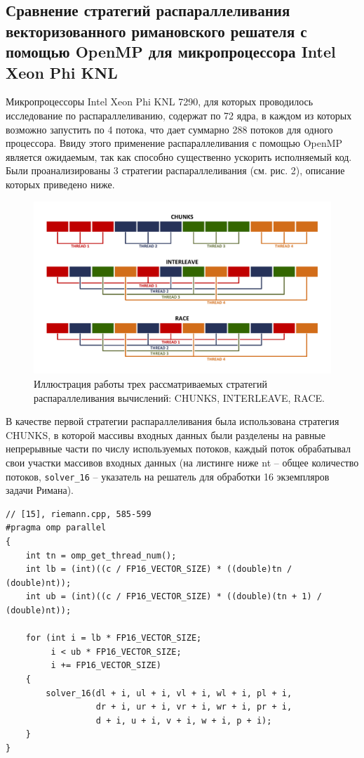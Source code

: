 \subsection{Сравнение стратегий распараллеливания векторизованного римановского решателя с помощью OpenMP для микропроцессора Intel Xeon Phi KNL}

Микропроцессоры Intel Xeon Phi KNL 7290, для которых проводилось исследование по распараллеливанию, содержат по 72 ядра, в каждом из которых возможно запустить  по 4 потока, что дает суммарно 288 потоков для одного процессора.
Ввиду этого применение распараллеливания с помощью OpenMP является ожидаемым, так как способно существенно ускорить исполняемый код. Были проанализированы 3 стратегии распараллеливания (см. рис. 2), описание которых приведено ниже.

\begin{figure}[ht]
\centering
\includegraphics[width=1.0\textwidth]{./pics/text_3_omp1/modes.pdf}
\caption{Иллюстрация работы трех рассматриваемых стратегий распараллеливания вычислений: CHUNKS, INTERLEAVE, RACE.}
\label{fig:text_3_omp1_modes}
\end{figure}

В качестве первой стратегии распараллеливания была использована стратегия CHUNKS, в которой массивы входных данных были разделены на равные непрерывные части по числу используемых потоков, каждый поток обрабатывал свои участки массивов входных данных (на листинге ниже nt -- общее количество потоков, \texttt{solver\_16} -- указатель на решатель для обработки 16 экземпляров задачи Римана).

\begin{lstlisting}[caption={caption},label={label}]
// [15], riemann.cpp, 585-599
#pragma omp parallel
{
    int tn = omp_get_thread_num();
    int lb = (int)((c / FP16_VECTOR_SIZE) * ((double)tn / (double)nt));
    int ub = (int)((c / FP16_VECTOR_SIZE) * ((double)(tn + 1) / (double)nt));

    for (int i = lb * FP16_VECTOR_SIZE;
         i < ub * FP16_VECTOR_SIZE;
         i += FP16_VECTOR_SIZE)
    {
        solver_16(dl + i, ul + i, vl + i, wl + i, pl + i,
                  dr + i, ur + i, vr + i, wr + i, pr + i,
                  d + i, u + i, v + i, w + i, p + i);
    }
}
\end{lstlisting}

